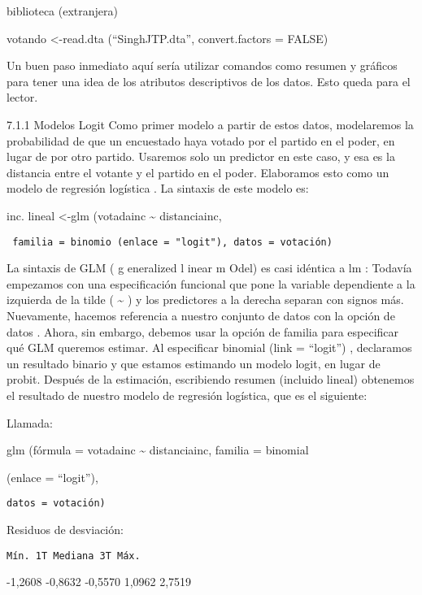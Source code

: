 \documentclass[
]{book}
\begin{document}
biblioteca (extranjera)

votando \textless-read.dta (``SinghJTP.dta'', convert.factors = FALSE)

Un buen paso inmediato aquí sería utilizar comandos como resumen y gráficos para tener una idea de los atributos descriptivos de los datos. Esto queda para el lector.

7.1.1 Modelos Logit
Como primer modelo a partir de estos datos, modelaremos la probabilidad de que un encuestado haya votado por el partido en el poder, en lugar de por otro partido. Usaremos solo un predictor en este caso, y esa es la distancia entre el votante y el partido en el poder. Elaboramos esto como un modelo de regresión logística . La sintaxis de este modelo es:

inc. lineal \textless-glm (votadainc \textasciitilde{} distanciainc,

\begin{verbatim}
 familia = binomio (enlace = "logit"), datos = votación)
\end{verbatim}

La sintaxis de GLM ( g eneralized l inear m Odel) es casi idéntica a lm : Todavía empezamos con una especificación funcional que pone la variable dependiente a la izquierda de la tilde ( \textasciitilde{} ) y los predictores a la derecha separan con signos más. Nuevamente, hacemos referencia a nuestro conjunto de datos con la opción de datos . Ahora, sin embargo, debemos usar la opción de familia para especificar qué GLM queremos estimar. Al especificar binomial (link = ``logit'') , declaramos un resultado binario y que estamos estimando un modelo logit, en lugar de probit. Después de la estimación, escribiendo resumen (incluido lineal) obtenemos el resultado de nuestro modelo de regresión logística, que es el siguiente:

Llamada:

glm (fórmula = votadainc \textasciitilde{} distanciainc, familia = binomial

(enlace = ``logit''),

\begin{verbatim}
datos = votación)
\end{verbatim}

Residuos de desviación:

\begin{verbatim}
Mín. 1T Mediana 3T Máx.
\end{verbatim}

-1,2608 -0,8632 -0,5570 1,0962 2,7519
\end{document}
